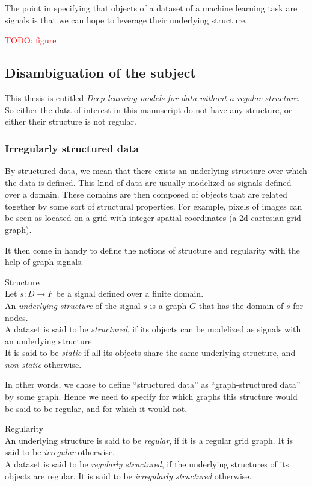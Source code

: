 The point in specifying that objects of a dataset of a machine learning task are signals is that we can hope to leverage their underlying structure.

\textcolor{red}{TODO: figure}

\subsection{Disambiguation of the subject}

This thesis is entitled \emph{Deep learning models for data without a regular structure}.
So either the data of interest in this manuscript do not have any structure, or either their structure is not regular.

\subsubsection{Irregularly structured data}

By structured data, we mean that there exists an underlying structure over which the data is defined. This kind of data are usually modelized as signals defined over a domain. These domains are then composed of objects that are related together by some sort of structural properties. For example, pixels of images can be seen as located on a grid with integer spatial coordinates (a 2d cartesian grid graph).

It then come in handy to define the notions of structure and regularity with the help of graph signals.

\begin{definition}{Structure}\\
  Let $s: D \rightarrow F$ be a signal defined over a finite domain.\\
  An \emph{underlying structure} of the signal $s$ is a graph $G$ that has the domain of $s$ for nodes.\\
  A dataset is said to be \emph{structured}, if its objects can be modelized as signals with an underlying structure.\\
  It is said to be \emph{static} if all its objects share the same underlying structure, and \emph{non-static} otherwise.
\end{definition}

In other words, we chose to define ``structured data'' as ``graph-structured data'' by some graph. Hence we need to specify for which graphs this structure would be said to be regular, and for which it would not.

\begin{definition}{Regularity}\\
An underlying structure is said to be \emph{regular}, if it is a regular grid graph.
It is said to be \emph{irregular} otherwise.\\
A dataset is said to be \emph{regularly structured}, if the underlying structures of its objects are regular.
It is said to be \emph{irregularly structured} otherwise.
\end{definition}


